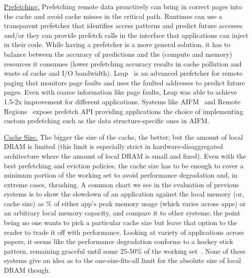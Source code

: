 \vspace{3pt}
\noindent \uline{Prefetching.}
Prefetching remote data proactively can bring in 
correct pages into the cache and avoid cache misses 
in the critical path. Runtimes can use a transparent 
prefetcher that identifies access patterns and predict 
future accesses and/or they can provide prefetch calls 
in the interface that applications can inject in their 
code. While having a prefetcher is a more general 
solution, it has to balance between the accuracy of 
predictions and the (compute and memory) resources
it consumes (lower prefetching accuracy results in 
cache pollution and waste of cache and I/O bandwidth).
Leap~\cite{leap} is an advanced prefetcher for remote 
paging that monitors page faults and uses the faulted 
addresses to predict future pages. Even with coarse 
information like page faults, Leap was able to achieve 
1.5-2x improvement for different applications. 
Systems like AIFM~\cite{aifm} and Remote 
Regions~\cite{remregions} expose prefetch API 
providing applications the choice of implementing custom
prefetching such as the data structure-specific ones in AIFM. 

\vspace{3pt}
\noindent \uline{Cache Size.}
The bigger the size of the cache, the better; but the 
amount of local DRAM is limited (this limit is 
especially strict in hardware-disaggregated architecture 
where the amount of local DRAM is small and fixed). 
Even with the best prefetching and eviction policies, 
the cache size has to be enough to cover a minimum portion 
of the working set to avoid performance degradation and, 
in extreme cases, thrashing. A common chart we see in the 
evaluation of previous systems is to show the slowdown of 
an application against the local memory (or, cache size) as 
\% of either app's peak memory usage (which varies across 
apps) or an arbitrary local memory capacity, and compare 
it to other systems; the point being no one wants to pick 
a particular cache size but leave that option to the reader 
to trade it off with performance. Looking at variety of 
applications across papers, it seems like the performance 
degradation conforms to a hockey stick pattern, remaining 
graceful until some 25-50\% of the working 
set~\cite{netdisagg,kona,legoos}. None of these systems give 
an idea as to the one-size-fits-all limit for the absolute 
size of local DRAM though.  


